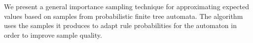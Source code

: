 We present a general importance sampling technique for approximating expected values based on samples from probabilistic finite tree automata. The algorithm uses the samples it produces to adapt rule probabilities for the automaton in order to improve sample quality.

